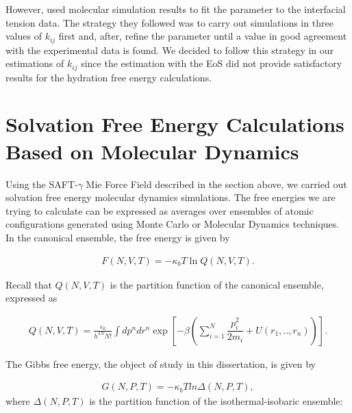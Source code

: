 However,  used molecular simulation results to fit the parameter to the interfacial tension data. The strategy they followed was to carry out simulations in three values of $k_{ij}$ first and, after, refine the parameter until a value in good agreement with the experimental data is found. We decided to follow this strategy in our estimations of $k_{ij}$ since the estimation with the EoS did not provide satisfactory results for the hydration free energy calculations.  


\section{Solvation Free Energy Calculations Based on Molecular Dynamics}

Using the SAFT-$\gamma$ Mie Force Field described in the section above, we carried out solvation free energy molecular dynamics simulations. The free energies we are trying to calculate can be expressed as averages over ensembles of atomic configurations generated using Monte Carlo or Molecular Dynamics techniques. In the canonical ensemble, the free energy is given by  

\begin{equation}
\label{eq:fcano}
\begin{aligned}
F(N,V,T) = -\kappa_{b}T \ln Q(N,V,T).
\end{aligned}
\end{equation}

Recall that $Q(N,V,T)$ is the partition function of the canonical ensemble, expressed as

\begin{equation}
\label{eq:partican}
\begin{aligned}
Q(N,V,T) =\frac{\epsilon_{0}}{h^{3N}N!} \int dp^{n} dr^{n} \exp \left[ -\beta \left( \sum_{i=1}^{N}\dfrac{p_{i}^{2}}{2m_{i}} + U(r_{1},..,r_{n}) \right)
\right] .
\end{aligned}
\end{equation}

The Gibbs free energy, the object of study in this dissertation, is given by

\begin{equation}
\begin{aligned}
G(N,P,T) = -\kappa_{b}T ln \Delta (N,P,T),
\end{aligned}
\end{equation}
where $\Delta (N,P,T)$ is the partition function of the isothermal-isobaric ensemble:

